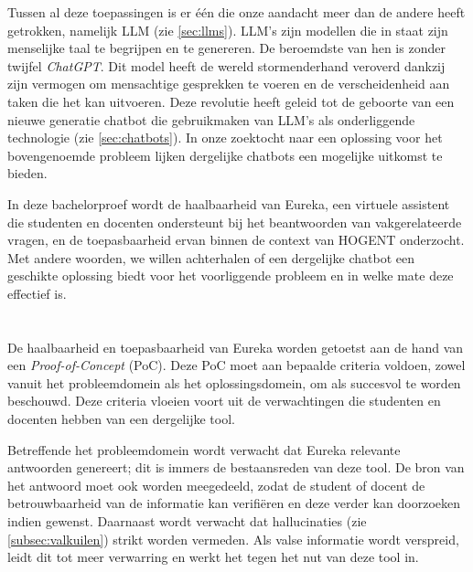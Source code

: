 Tussen al deze toepassingen is er één die onze aandacht meer dan de andere heeft getrokken, namelijk \acrfull{LLM} (zie \ref{sec:llms}). \acrshort{LLM}'s zijn modellen die in staat zijn menselijke taal te begrijpen en te genereren. De beroemdste van hen is zonder twijfel \textit{ChatGPT}. Dit model heeft de wereld stormenderhand veroverd dankzij zijn vermogen om mensachtige gesprekken te voeren en de verscheidenheid aan taken die het kan uitvoeren. Deze revolutie heeft geleid tot de geboorte van een nieuwe generatie chatbot die gebruikmaken van \acrshort{LLM}'s als onderliggende technologie (zie \ref{sec:chatbots}). In onze zoektocht naar een oplossing voor het bovengenoemde probleem lijken dergelijke chatbots een mogelijke uitkomst te bieden.

In deze bachelorproef wordt de haalbaarheid van Eureka, een virtuele assistent die studenten en docenten ondersteunt bij het beantwoorden van vakgerelateerde vragen, en de toepasbaarheid ervan binnen de context van HOGENT onderzocht. Met andere woorden, we willen achterhalen of een dergelijke chatbot een geschikte oplossing biedt voor het voorliggende probleem en in welke mate deze effectief is.
 
\section{}%
\label{sec:onderzoeksdoelstelling}


De haalbaarheid en toepasbaarheid van Eureka worden getoetst aan de hand van een \textit{Proof-of-Concept} (PoC). Deze PoC moet aan bepaalde criteria voldoen, zowel vanuit het probleemdomein als het oplossingsdomein, om als succesvol te worden beschouwd. Deze criteria vloeien voort uit de verwachtingen die studenten en docenten hebben van een dergelijke tool.

Betreffende het probleemdomein wordt verwacht dat Eureka relevante antwoorden genereert; dit is immers de bestaansreden van deze tool. De bron van het antwoord moet ook worden meegedeeld, zodat de student of docent de betrouwbaarheid van de informatie kan verifiëren en deze verder kan doorzoeken indien gewenst. Daarnaast wordt verwacht dat hallucinaties (zie \ref{subsec:valkuilen}) strikt worden vermeden. Als valse informatie wordt verspreid, leidt dit tot meer verwarring en werkt het tegen het nut van deze tool in.

